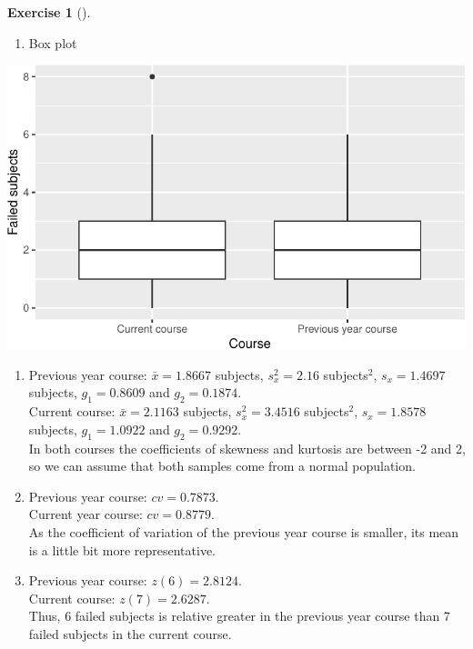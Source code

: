 \documentclass[
  a4paper,
]{scrreport}
\providecommand{\tightlist}{%
  \setlength{\itemsep}{0pt}\setlength{\parskip}{0pt}}\usepackage{longtable,booktabs,array}
\theoremstyle{definition}
\newtheorem{exercise}{Exercise}[chapter]
\theoremstyle{remark}
\begin{document}
\begin{exercise}[]
\begin{tcolorbox}
\begin{enumerate}
\def\labelenumi{\alph{enumi}.}
\tightlist
\item
  Box plot
\end{enumerate}

\includegraphics{exam-2023-05-30-des_files/figure-pdf/box-plot-1.pdf}

\begin{enumerate}
\def\labelenumi{\alph{enumi}.}
\item
  Previous year course: \(\bar x = 1.8667\) subjects, \(s_x^2=2.16\)
  subjects\(^2\), \(s_x=1.4697\) subjects, \(g_1 = 0.8609\) and
  \(g_2 = 0.1874\).\\
  Current course: \(\bar x = 2.1163\) subjects, \(s_x^2=3.4516\)
  subjects\(^2\), \(s_x=1.8578\) subjects, \(g_1 = 1.0922\) and
  \(g_2 = 0.9292\).\\
  In both courses the coefficients of skewness and kurtosis are between
  -2 and 2, so we can assume that both samples come from a normal
  population.
\item
  Previous year course: \(cv = 0.7873\).\\
  Current year course: \(cv = 0.8779\).\\
  As the coefficient of variation of the previous year course is
  smaller, its mean is a little bit more representative.
\item
  Previous year course: \(z(6) = 2.8124\).\\
  Current course: \(z(7) = 2.6287\).\\
  Thus, 6 failed subjects is relative greater in the previous year
  course than 7 failed subjects in the current course.
\end{enumerate}

\end{tcolorbox}

\end{exercise}
\end{document}

